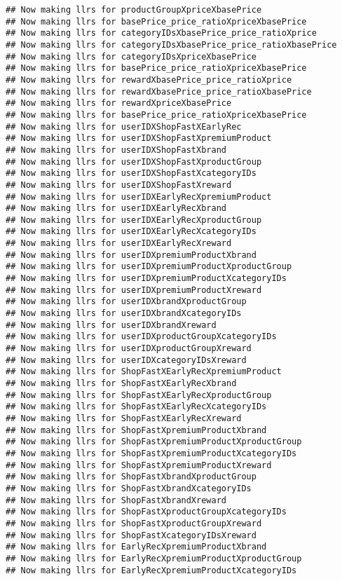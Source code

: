 \documentclass[10pt]{report}
\begin{document}
\begin{verbatim}
## Now making llrs for productGroupXpriceXbasePrice
## Now making llrs for basePrice_price_ratioXpriceXbasePrice
## Now making llrs for categoryIDsXbasePrice_price_ratioXprice
## Now making llrs for categoryIDsXbasePrice_price_ratioXbasePrice
## Now making llrs for categoryIDsXpriceXbasePrice
## Now making llrs for basePrice_price_ratioXpriceXbasePrice
## Now making llrs for rewardXbasePrice_price_ratioXprice
## Now making llrs for rewardXbasePrice_price_ratioXbasePrice
## Now making llrs for rewardXpriceXbasePrice
## Now making llrs for basePrice_price_ratioXpriceXbasePrice
## Now making llrs for userIDXShopFastXEarlyRec
## Now making llrs for userIDXShopFastXpremiumProduct
## Now making llrs for userIDXShopFastXbrand
## Now making llrs for userIDXShopFastXproductGroup
## Now making llrs for userIDXShopFastXcategoryIDs
## Now making llrs for userIDXShopFastXreward
## Now making llrs for userIDXEarlyRecXpremiumProduct
## Now making llrs for userIDXEarlyRecXbrand
## Now making llrs for userIDXEarlyRecXproductGroup
## Now making llrs for userIDXEarlyRecXcategoryIDs
## Now making llrs for userIDXEarlyRecXreward
## Now making llrs for userIDXpremiumProductXbrand
## Now making llrs for userIDXpremiumProductXproductGroup
## Now making llrs for userIDXpremiumProductXcategoryIDs
## Now making llrs for userIDXpremiumProductXreward
## Now making llrs for userIDXbrandXproductGroup
## Now making llrs for userIDXbrandXcategoryIDs
## Now making llrs for userIDXbrandXreward
## Now making llrs for userIDXproductGroupXcategoryIDs
## Now making llrs for userIDXproductGroupXreward
## Now making llrs for userIDXcategoryIDsXreward
## Now making llrs for ShopFastXEarlyRecXpremiumProduct
## Now making llrs for ShopFastXEarlyRecXbrand
## Now making llrs for ShopFastXEarlyRecXproductGroup
## Now making llrs for ShopFastXEarlyRecXcategoryIDs
## Now making llrs for ShopFastXEarlyRecXreward
## Now making llrs for ShopFastXpremiumProductXbrand
## Now making llrs for ShopFastXpremiumProductXproductGroup
## Now making llrs for ShopFastXpremiumProductXcategoryIDs
## Now making llrs for ShopFastXpremiumProductXreward
## Now making llrs for ShopFastXbrandXproductGroup
## Now making llrs for ShopFastXbrandXcategoryIDs
## Now making llrs for ShopFastXbrandXreward
## Now making llrs for ShopFastXproductGroupXcategoryIDs
## Now making llrs for ShopFastXproductGroupXreward
## Now making llrs for ShopFastXcategoryIDsXreward
## Now making llrs for EarlyRecXpremiumProductXbrand
## Now making llrs for EarlyRecXpremiumProductXproductGroup
## Now making llrs for EarlyRecXpremiumProductXcategoryIDs

\end{verbatim}
\end{document}
